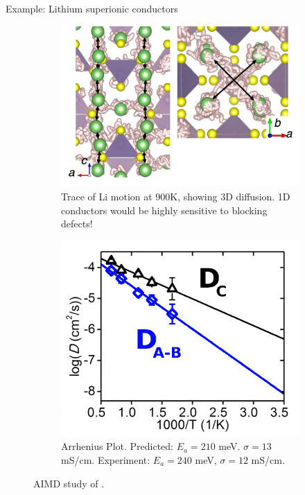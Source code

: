 \documentclass[aspectratio=169]{beamer}
\begin{document}
\begin{frame}{Example: Lithium superionic conductors}
\begin{figure}
    \centering
    \begin{subfigure}{0.45\textwidth}
        \centering
        \includegraphics[width=0.9\linewidth]{lectures/figures/13-LGPS_1.png}
    \caption{Trace of Li motion at 900K, showing 3D diffusion. 1D conductors would be highly sensitive to blocking defects!}
    \end{subfigure}
    \begin{subfigure}{0.45\textwidth}
        \centering
        \includegraphics[width=0.8\linewidth]{lectures/figures/13-LGPS_2.png}
    \caption{Arrhenius Plot. Predicted: $E_a = 210$ meV. $\sigma = 13$ mS/cm. Experiment\cite{kamayaLithiumSuperionicConductor2011}: $E_a = 240$ meV, $\sigma = 12$ mS/cm.
}
    \end{subfigure}
    \caption{AIMD study of .\cite{moFirstPrinciplesStudy2012}}
\end{figure} 
\end{frame} 
\end{document}
